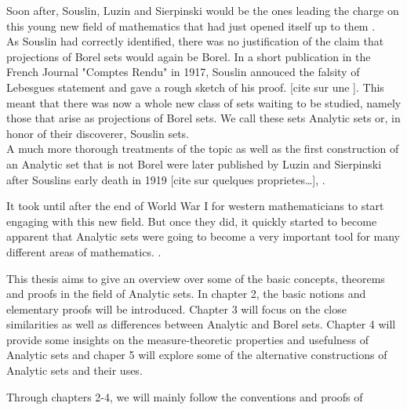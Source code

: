\documentclass[10pt, a4paper, titlepage]{article}
\numberwithin{equation}{section}
\begin{document}
Soon after, Souslin, Luzin and Sierpinski would be the ones leading the charge on this young new field of mathematics that had just opened itself up to them \cite{rogers1980}. \\
As Souslin had correctly identified, there was no justification of the claim that projections of Borel sets would again be Borel.
In a short publication in the French Journal "Comptes Rendu" in 1917, Souslin annouced the falsity of Lebesgues statement and gave a rough sketch of his proof. [cite sur une ].
This meant that there was now a whole new class of sets waiting to be studied, namely those that arise as projections of Borel sets. We call these sets Analytic sets or, in honor of their discoverer, Souslin sets.\\
A much more thorough treatments of the topic as well as the first construction of an Analytic set that is not Borel were later published by Luzin and Sierpinski after Souslins early death in 1919 [cite sur quelques proprietes\ldots], \cite{lusin1923} \cite{lusin1927}.

It took until after the end of World War I for western mathematicians to start engaging with this new field. 
But once they did, it quickly started to become apparent that Analytic sets were going to become a very important tool for many different areas of mathematics. \cite{Moschovakis1987} \cite{rogers1980}.

This thesis aims to give an overview over some of the basic concepts, theorems and proofs in the field of Analytic sets. 
In chapter 2, the basic notions and elementary proofs will be introduced. Chapter 3 will focus on the close similarities as well as differences between Analytic and Borel sets. Chapter 4 will provide some insights on the measure-theoretic properties and usefulness of Analytic sets and chaper 5 will explore some of the alternative constructions of Analytic sets and their uses. 

Through chapters 2-4, we will mainly follow the conventions and proofs of \cite{cohn2013}



\end{document}
